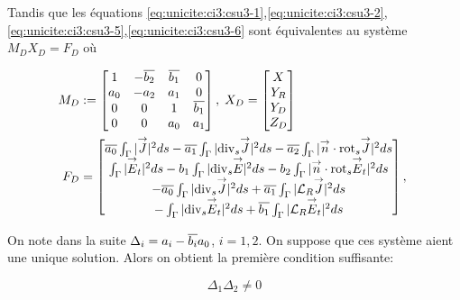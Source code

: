   Tandis que les équations \eqref{eq:unicite:ci3:csu3-1},\eqref{eq:unicite:ci3:csu3-2},\eqref{eq:unicite:ci3:csu3-5},\eqref{eq:unicite:ci3:csu3-6} sont équivalentes au système \(M_D X_D= F_D\) où

  \begin{align*}
    M_D&:=
    \begin{bmatrix}
      1&-{\overline{b_2}}&{\overline{b_1}}&0\\
      a_0&-a_2&a_1&0\\
      0&0&1&{\overline{b_1}}\\
      0&0&a_0&a_1\\
    \end{bmatrix},\;
    X_D =
    \begin{bmatrix}
      X\\
      Y_R\\
      Y_D\\
      Z_D
    \end{bmatrix}\\
    F_D &=
    \begin{bmatrix}
      {\overline{a_0}} \int_\Gamma |{\overset{\rightarrow}{J}}|^2ds - {\overline{a_1}} \int_\Gamma |{\operatorname{div}_s} {\overset{\rightarrow}{J}}|^2 ds - {\overline{a_2}} \int_\Gamma |{\overset{\rightarrow}{n}} \cdot {{\operatorname{rot}}_s} {\overset{\rightarrow}{J}}|^2 ds \\
      \int_\Gamma |{\overset{\rightarrow}{E}}_t|^2 ds  - b_1 \int_\Gamma | {\operatorname{div}_s} {\overset{\rightarrow}{E}} |^2 ds - b_2 \int_\Gamma | {\overset{\rightarrow}{n}} \cdot {{\operatorname{rot}}_s} {\overset{\rightarrow}{E}}_t|^2 ds \\
      -{\overline{a_0}} \int_\Gamma |{\operatorname{div}_s} {\overset{\rightarrow}{J}}|^2ds + {\overline{a_1}} \int_\Gamma | {\mathcal{L}_R} {\overset{\rightarrow}{J}}|^2 ds \\
      -\int_\Gamma | {\operatorname{div}_s} {\overset{\rightarrow}{E}}_t |^2 ds  + {\overline{b_1}} \int_\Gamma | {\mathcal{L}_R} {\overset{\rightarrow}{E}}_t|^2 ds
    \end{bmatrix},\;
  \end{align*}

  On note dans la suite \(\Delta_i = a_i-{\overline{b_i}}a_0\), \(i=1,2\). On suppose que ces système aient une unique solution. Alors on obtient la première condition suffisante:

  \begin{equation}
    \label{eq:unicite:ci3:csu3-cn-det}
    \Delta_1\Delta_2 \not = 0
  \end{equation}

